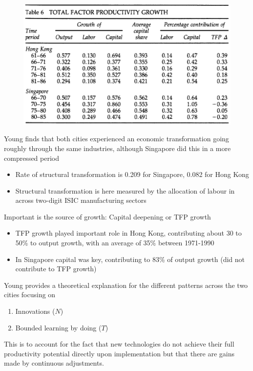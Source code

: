 \documentclass{beamer}
\begin{document}
\begin{frame}
  \begin{figure}
    \includegraphics[scale=.8]{young2.eps}
  \end{figure}
\end{frame}

\begin{frame}
  Young finds that both cities experienced an economic transformation going roughly through the same industries, although Singapore did this in a more compressed period
  \begin{itemize}
    \item Rate of structural transformation is 0.209 for Singapore, 0.082 for Hong Kong    
    \item Structural transformation is here measured by the allocation of labour in across two-digit ISIC manufacturing sectors
  \end{itemize}  
  \medskip
  Important is the source of growth: Capital deepening or TFP growth
  \begin{itemize}
    \item TFP growth played important role in Hong Kong, contributing about 30 to 50\% to output growth, with an average of 35\% between 1971-1990
    \item In Singapore capital was key, contributing to 83\% of output growth (did not contribute to TFP growth)
  \end{itemize}
\end{frame}

\begin{frame}
Young provides a theoretical explanation for the different patterns across the two cities focusing on
\begin{enumerate}
  \item Innovations ($N$)
  \item Bounded learning by doing ($T$)
\end{enumerate}
This is to account for the fact that new technologies do not achieve their full productivity potential directly upon implementation but that there are gains made by continuous adjustments.
\end{frame}
\end{document}
